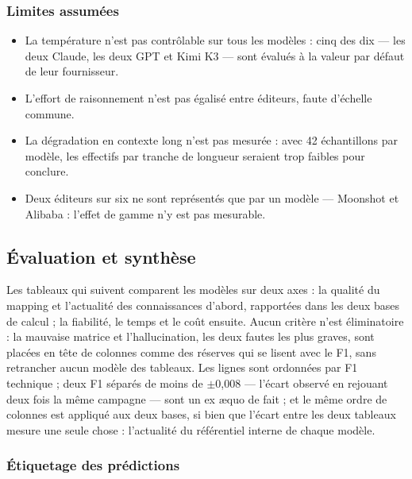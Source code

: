 \subsubsection{Limites assumées}\label{sec:4-4}
\begin{itemize}
\item
  La température n'est pas contrôlable sur tous les modèles : cinq des dix --- les deux Claude, les deux GPT et Kimi K3 --- sont évalués à la valeur par défaut de leur fournisseur.
\item
  L'effort de raisonnement n'est pas égalisé entre éditeurs, faute d'échelle commune.
\item
  La dégradation en contexte long n'est pas mesurée : avec 42 échantillons par modèle, les effectifs par tranche de longueur seraient trop faibles pour conclure.
\item
  Deux éditeurs sur six ne sont représentés que par un modèle --- Moonshot et Alibaba : l'effet de gamme n'y est pas mesurable.
\end{itemize}

\FloatBarrier
\subsection{Évaluation et synthèse}\label{sec:meth-evaluation}

Les tableaux qui suivent comparent les modèles sur deux axes : la qualité du mapping et l'actualité des connaissances d'abord, rapportées dans les deux bases de calcul ; la fiabilité, le temps et le coût ensuite. Aucun critère n'est éliminatoire : la mauvaise matrice et l'hallucination, les deux fautes les plus graves, sont placées en tête de colonnes comme des réserves qui se lisent avec le F1, sans retrancher aucun modèle des tableaux. Les lignes sont ordonnées par F1 technique ; deux F1 séparés de moins de $\pm$0,008 --- l'écart observé en rejouant deux fois la même campagne --- sont un ex æquo de fait ; et le même ordre de colonnes est appliqué aux deux bases, si bien que l'écart entre les deux tableaux mesure une seule chose : l'actualité du référentiel interne de chaque modèle.

\subsubsection{Étiquetage des prédictions}\label{sec:5-1}

